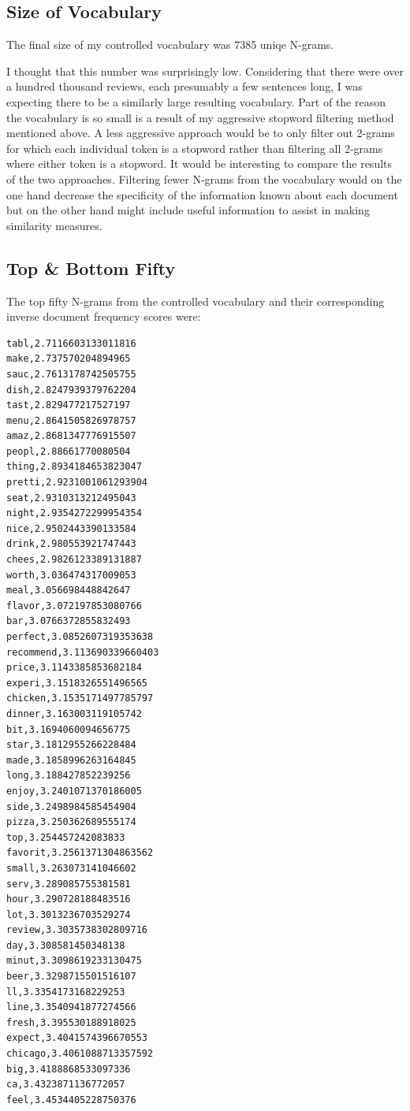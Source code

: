 \documentclass[paper=a4, fontsize=11pt]{jhwhw} %
\begin{document}
\subsection{Size of Vocabulary}
The final size of my controlled vocabulary was 7385 uniqe N-grams. 

I thought that this number was surprisingly low. Considering that there were over a hundred thousand reviews, each presumably a few sentences long, I was expecting there to be a similarly large resulting vocabulary. Part of the reason the vocabulary is so small is a result of my aggressive stopword filtering method mentioned above. A less aggressive approach would be to only filter out 2-grams for which each individual token is a stopword rather than filtering all 2-grams where either token is a stopword. It would be interesting to compare the results of the two approaches. Filtering fewer N-grams from the vocabulary would on the one hand decrease the specificity of the information known about each document but on the other hand might include useful information to assist in making similarity measures. 

\subsection{Top \& Bottom Fifty}
The top fifty N-grams from the controlled vocabulary and their corresponding inverse document frequency scores were:
\begin{verbatim}
tabl,2.7116603133011816
make,2.737570204894965
sauc,2.7613178742505755
dish,2.8247939379762204
tast,2.829477217527197
menu,2.8641505826978757
amaz,2.8681347776915507
peopl,2.88661770080504
thing,2.8934184653823047
pretti,2.9231001061293904
seat,2.9310313212495043
night,2.9354272299954354
nice,2.9502443390133584
drink,2.980553921747443
chees,2.9826123389131887
worth,3.036474317009053
meal,3.056698448842647
flavor,3.072197853080766
bar,3.0766372855832493
perfect,3.0852607319353638
recommend,3.113690339660403
price,3.1143385853682184
experi,3.1518326551496565
chicken,3.1535171497785797
dinner,3.163003119105742
bit,3.1694060094656775
star,3.1812955266228484
made,3.1858996263164845
long,3.188427852239256
enjoy,3.2401071370186005
side,3.2498984585454904
pizza,3.250362689555174
top,3.254457242083833
favorit,3.2561371304863562
small,3.263073141046602
serv,3.289085755381581
hour,3.290728188483516
lot,3.3013236703529274
review,3.3035738302809716
day,3.308581450348138
minut,3.3098619233130475
beer,3.3298715501516107
ll,3.3354173168229253
line,3.3540941877274566
fresh,3.395530188918025
expect,3.4041574396670553
chicago,3.4061088713357592
big,3.4188868533097336
ca,3.4323871136772057
feel,3.4534405228750376
\end{verbatim}
\end{document}
